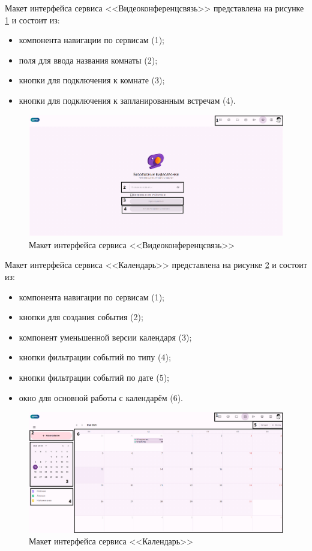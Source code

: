 Макет интерфейса сервиса <<Видеоконференцсвязь>> представлена на рисунке \ref{templ:image2} и состоит из:
\begin{itemize}
  \item компонента навигации по сервисам (1);
  \item поля для ввода названия комнаты (2);
  \item кнопки для подключения к комнате (3);
  \item кнопки для подключения к запланированным встречам (4).
\end{itemize}
\begin{figure}[H]
	\centering
	\includegraphics[width=1\linewidth]{images/вкс}
	\caption{Макет интерфейса сервиса <<Видеоконференцсвязь>>}
	\label{templ:image2}
\end{figure}

Макет интерфейса сервиса <<Календарь>> представлена на рисунке \ref{templ:image3} и состоит из:
\begin{itemize}
  \item компонента навигации по сервисам (1);
  \item кнопки для создания события (2);
  \item компонент уменьшенной версии календаря (3);
  \item кнопки фильтрации событий по типу (4);
  \item кнопки фильтрации событий по дате (5);
  \item окно для основной работы с календарём (6).
\end{itemize}
\begin{figure}[H]
	\centering
	\includegraphics[width=1\linewidth]{images/календарь}
	\caption{Макет интерфейса сервиса <<Календарь>>}
	\label{templ:image3}
\end{figure}

